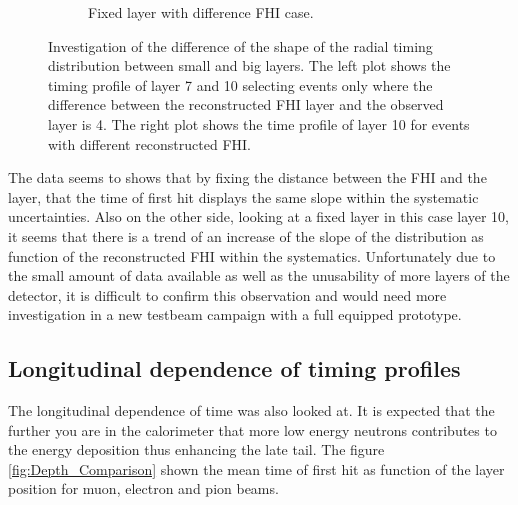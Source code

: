 \begin{figure}[htbp!]
\begin{subfigure}[t]{0.5\textwidth}
		\caption{Fixed layer with difference FHI case.}\label{fig:Radius_FHI_Fixed}
	\end{subfigure}
	\caption{Investigation of the difference of the shape of the radial timing distribution between small and big layers. The left plot shows the timing profile of layer 7 and 10 selecting events only where the difference between the reconstructed FHI layer and the observed layer is 4. The right plot shows the time profile of layer 10 for events with different reconstructed FHI.}
	\label{fig:Radius_FHI}
\end{figure}

The data seems to shows that by fixing the distance between the FHI and the layer, that the time of first hit displays the same slope within the systematic uncertainties. Also on the other side, looking at a fixed layer in this case layer 10, it seems that there is a trend of an increase of the slope of the distribution as function of the reconstructed FHI within the systematics. Unfortunately due to the small amount of data available as well as the unusability of more layers of the detector, it is difficult to confirm this observation and would need more investigation in a new testbeam campaign with a full equipped prototype.

\subsection{Longitudinal dependence of timing profiles}

The longitudinal dependence of time was also looked at. It is expected that the further you are in the calorimeter that more low energy neutrons contributes to the energy deposition thus enhancing the late tail. The figure \ref{fig:Depth_Comparison} shown the mean time of first hit as function of the layer position for muon, electron and pion beams.


